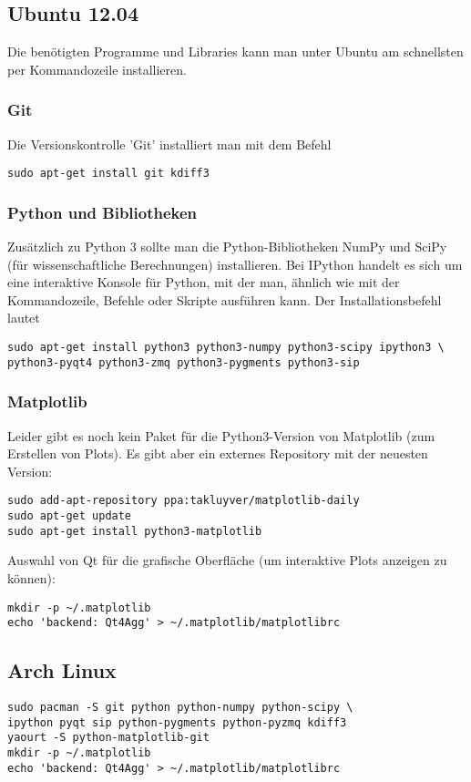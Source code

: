 \subsection{Ubuntu 12.04}
Die benötigten Programme und Libraries kann man unter Ubuntu am schnellsten per Kommandozeile installieren.

\subsubsection{Git}
Die Versionskontrolle 'Git' installiert man mit dem Befehl
\begin{verbatim}
sudo apt-get install git kdiff3
\end{verbatim}

\subsubsection{Python und Bibliotheken}
Zusätzlich zu Python 3 sollte man die Python-Bibliotheken NumPy und SciPy (für wissenschaftliche Berechnungen) installieren.
Bei IPython handelt es sich um eine interaktive Konsole für Python, mit der man, ähnlich wie mit der Kommandozeile, Befehle oder Skripte ausführen kann.
Der Installationsbefehl lautet
\begin{verbatim}
sudo apt-get install python3 python3-numpy python3-scipy ipython3 \
python3-pyqt4 python3-zmq python3-pygments python3-sip
\end{verbatim}

\subsubsection{Matplotlib}
Leider gibt es noch kein Paket für die Python3-Version von Matplotlib (zum Erstellen von Plots).
Es gibt aber ein externes Repository mit der neuesten Version:
\begin{verbatim}
sudo add-apt-repository ppa:takluyver/matplotlib-daily
sudo apt-get update
sudo apt-get install python3-matplotlib
\end{verbatim}
Auswahl von Qt für die grafische Oberfläche (um interaktive Plots anzeigen zu können):
\begin{verbatim}
mkdir -p ~/.matplotlib
echo 'backend: Qt4Agg' > ~/.matplotlib/matplotlibrc
\end{verbatim}

\subsection{Arch Linux}
\begin{verbatim}
sudo pacman -S git python python-numpy python-scipy \
ipython pyqt sip python-pygments python-pyzmq kdiff3
yaourt -S python-matplotlib-git
mkdir -p ~/.matplotlib
echo 'backend: Qt4Agg' > ~/.matplotlib/matplotlibrc
\end{verbatim}

